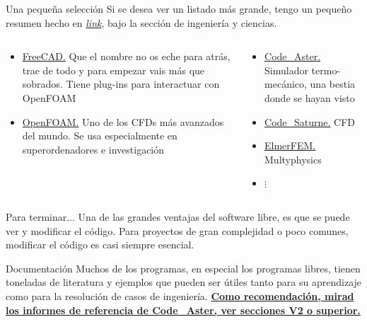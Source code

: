 \documentclass[12pt]{beamer}
\begin{document}
\begin{frame}{Una pequeña selección}
	Si se desea ver un listado más grande, tengo un pequeño resumen hecho en \textit{\href{https://github.com/Irvise/Documents/blob/master/Cheatsheets/Libre/Packages.md}{link}}, bajo la sección de ingeniería y ciencias.
	\begin{columns}
		\begin{column}{0.6\textwidth}
			\begin{itemize}
				\item \href{https://www.freecadweb.org/}{FreeCAD.} Que el nombre no os eche para atrás, trae de todo y para empezar vais más que sobrados. Tiene plug-ins para interactuar con OpenFOAM
				\item \href{https://openfoam.org/}{OpenFOAM.} Uno de los CFDs más avanzados del mundo. Se usa especialmente en superordenadores e investigación
			\end{itemize}
		\end{column}
		\begin{column}{0.5\textwidth}
			\begin{itemize}
				\item \href{https://code-aster.org/spip.php?rubrique2}{Code\_Aster.} Simulador termo-mecánico, una bestia donde se hayan visto
				\item \href{https://www.code-saturne.org/cms/}{Code\_Saturne.} CFD
				\item \href{http://www.elmerfem.org/blog/}{ElmerFEM.} Multyphysics
				\item $\vdots$
			\end{itemize}
		\end{column}
	\end{columns}
\end{frame}

\begin{frame}{Para terminar...}
	Una de las grandes ventajas del software libre, es que se puede ver y modificar el código. Para proyectos de gran complejidad o poco comunes, modificar el código es casi siempre esencial.
	
	\begin{block}{Documentación}
		Muchos de los programas, en especial los programas libres, tienen toneladas de literatura y ejemplos que pueden ser útiles tanto para su aprendizaje como para la resolución de casos de ingeniería. \href{https://www.code-aster.org/V2/doc/v13/en/index.php?man=R0}{\textbf{Como recomendación, mirad los informes de referencia de Code\_Aster, ver secciones V2 o superior.}}
	\end{block}
\end{frame}
\end{document}
